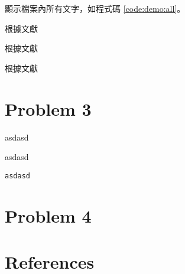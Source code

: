 \documentclass[12pt, a4paper]{article}
\begin{document}


顯示檔案內所有文字，如程式碼 \ref{code:demo:all}。



根據文獻 \cite{Chen2017b}

根據文獻 \cite{Features2018b}

根據文獻 \cite{Szeliski2010b}

\clearpage
\section{Problem 3}

asdasd

\textsf{asdasd}

\texttt{asdasd}

\clearpage
\section{Problem 4}

\clearpage
\section{References}

\begingroup  %
    \renewcommand{\section}[2]{}
    
    
\endgroup
\end{document}
